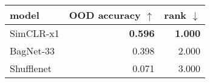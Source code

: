 \begin{tabular}{lrr}
\toprule
     model & OOD accuracy $\uparrow$ & rank $\downarrow$ \\
\midrule
 SimCLR-x1 &          \textbf{0.596} &    \textbf{1.000} \\
 BagNet-33 &                   0.398 &             2.000 \\
Shufflenet &                   0.071 &             3.000 \\
\bottomrule
\end{tabular}


